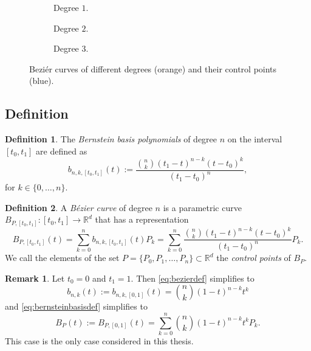 \documentclass[a4paper, 11pt]{report}
\theoremstyle{definition}
\newtheorem{definition}{Definition}[section]
\newtheorem*{remark}{Remark}
\renewcommand{\emph}[1]{\textit{#1}}
\begin{document}
\begin{figure}[H]
	\centering
	\begin{subfigure}{0.25\textwidth}
		
		\caption{Degree $1$.}
	\end{subfigure}
	\begin{subfigure}{0.25\textwidth}
		
		\caption{Degree $2$.}
	\end{subfigure}
	\begin{subfigure}{0.25\textwidth}
		
		\caption{Degree $3$.}
	\end{subfigure}
	\caption{Beziér curves of different degrees (orange) and their control points (blue).}
\end{figure}

\subsection{Definition}
\begin{definition}
	The \emph{Bernstein basis polynomials} of degree $n$ on the interval $[t_0,t_1]$ are defined as
	\begin{equation}\label{eq:bernsteinbasisdef}
		b_{n,k,[t_0, t_1]}(t) := \frac{\binom{n}{k} (t_1-t)^{n-k}(t-t_0)^k}{(t_1-t_0)^n},
	\end{equation}
	for $k \in \{0,\dots, n\}$.
\end{definition}

\begin{definition}
	A \emph{Bézier curve} of degree $n$ is a parametric curve $B_{P,[t_0, t_1]}: [t_0, t_1] \rightarrow \mathbb{R}^d$ that has a representation
	\begin{equation}\label{eq:bezierdef}
		B_{P, [t_0, t_1]}(t) = \sum_{k=0}^n b_{n,k,[t_0, t_1]}(t) P_k = \sum_{k=0}^n \frac{\binom{n}{k} (t_1-t)^{n-k}(t-t_0)^k}{(t_1-t_0)^n} P_k.
	\end{equation}
	We call the elements of the set $P = \{P_0, P_1, \dots, P_n\} \subset \mathbb{R}^d$ the \emph{control points} of $B_P$.
\end{definition}

\begin{remark}
	Let $t_0 = 0$ and $t_1 = 1$. Then \ref{eq:bezierdef} simplifies to
	\begin{equation}
		b_{n,k}(t) := b_{n,k,[0,1]}(t) = \binom{n}{k} (1-t)^{n-k}t^k
	\end{equation}
	and \ref{eq:bernsteinbasisdef} simplifies to
	\begin{equation}\label{eq:bezierdefshort}
		B_P(t) := B_{P,[0,1]}(t)= \sum_{k=0}^n \binom{n}{k} (1-t)^{n-k}t^k P_k.
	\end{equation}
	This case is the only case considered in this thesis.
\end{remark}
\end{document}
